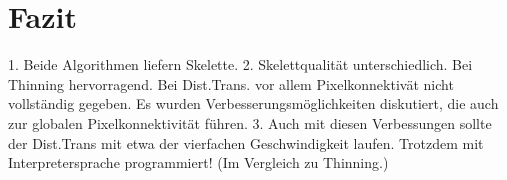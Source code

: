 \section{Fazit}
1. Beide Algorithmen liefern Skelette.
2. Skelettqualität unterschiedlich. Bei Thinning hervorragend. Bei Dist.Trans. vor allem Pixelkonnektivät nicht vollständig gegeben. Es wurden Verbesserungsmöglichkeiten diskutiert, die auch zur globalen Pixelkonnektivität führen.
3. Auch mit diesen Verbessungen sollte der Dist.Trans mit etwa der vierfachen Geschwindigkeit laufen. Trotzdem mit Interpretersprache programmiert! (Im Vergleich zu Thinning.)
